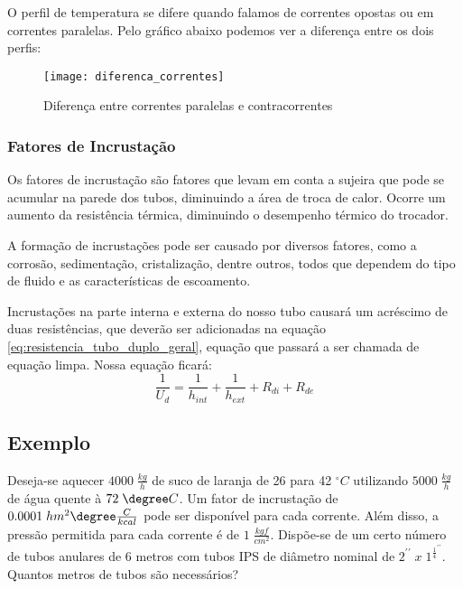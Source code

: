 O perfil de temperatura se difere quando falamos de correntes opostas ou em correntes paralelas.
Pelo gráfico abaixo podemos ver a diferença entre os dois perfis:
\begin{figure}[H]
    \centering
    \texttt{[image: diferenca\_correntes]}
    \caption{Diferença entre correntes paralelas e contracorrentes}
    \label{fig:diferenca_correntes}
\end{figure}
\subsubsection{Fatores de Incrustação}
Os fatores de incrustação são fatores que levam em conta a sujeira que pode se acumular na parede
dos tubos, diminuindo a área de troca de calor. Ocorre um aumento da resistência térmica, diminuindo
o desempenho térmico do trocador. \par

A formação de incrustações pode ser causado por diversos fatores, como a corrosão, sedimentação,
cristalização, dentre outros, todos que dependem do tipo de fluido e as características de
escoamento. \par

Incrustações na parte interna e externa do nosso tubo causará um acréscimo de duas resistências, que
deverão ser adicionadas na equação \ref{eq:resistencia_tubo_duplo_geral}, equação que passará a ser
chamada de equação limpa. Nossa equação ficará:
\begin{equation}\label{eq:resistencia_tubo_duplo_incrustado}
    \frac{1}{U_{d}} = \frac{1}{h_{int}} + \frac{1}{h_{ext}} + R_{di} + R_{de} 
\end{equation}
\subsection{Exemplo}
Deseja-se aquecer \(4000 \;\frac{kg}{h}\) de suco de laranja de 26 para 42 \(^{\circ}C\) utilizando  
\(5000 \; \frac{kg}{h}\) de água quente à \(72 \; \degree C\). Um fator de incrustação de \(0.0001
\; h m^{2} \degree \frac{C}{kcal}\) pode ser disponível para cada corrente. Além disso, a pressão
permitida para cada corrente é de \(1 \; \frac{kgf}{cm^{2}}\). Dispõe-se de um certo número de tubos
anulares de 6 metros com tubos IPS de diâmetro nominal de \(2^{\prime \prime} \; x \;
1^{\frac{1}{4}^{\prime \prime} } \). Quantos metros de tubos são necessários? \par

